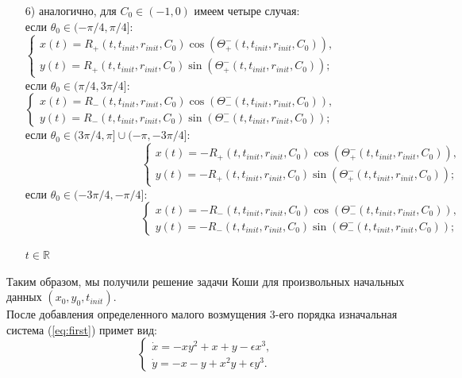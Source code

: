\begin{enumerate}
\item[{6)}] аналогично, для $C_0\in(-1,0)$ имеем четыре случая:\\
если $\theta_0 \in (-\pi/4, \pi/4]$:
$ \begin{cases}
       x(t) = R_+(t,t_{init}, r_{init}, C_0)\cos(\Theta^-_+(t,t_{init},r_{init},C_0)),\\
       y(t) = R_+(t,t_{init}, r_{init}, C_0)\sin(\Theta^-_+(t,t_{init},r_{init},C_0));
\end{cases}$ \\
если $\theta_0 \in (\pi/4, 3\pi/4]$:
$ \begin{cases}
       x(t) = R_-(t,t_{init}, r_{init}, C_0)\cos(\Theta^-_-(t,t_{init},r_{init},C_0)),\\
       y(t) = R_-(t,t_{init}, r_{init}, C_0)\sin(\Theta^-_-(t,t_{init},r_{init},C_0));
\end{cases}$ \\
если $ \theta_0 \in (3\pi/4, \pi]\cup(-\pi, -3\pi/4]$:\\
$\hspace{125pt} \begin{cases}
       x(t) = -R_+(t,t_{init}, r_{init}, C_0)\cos(\Theta^-_+(t,t_{init},r_{init},C_0)),\\
       y(t) = -R_+(t,t_{init}, r_{init}, C_0)\sin(\Theta^-_+(t,t_{init},r_{init},C_0));
\end{cases}$ \\
если $\theta_0 \in (-3\pi/4, -\pi/4]$:\\
$\hspace{125pt} \begin{cases}
       x(t) = -R_-(t,t_{init}, r_{init}, C_0)\cos(\Theta^-_-(t,t_{init},r_{init},C_0)),\\
       y(t) = -R_-(t,t_{init}, r_{init}, C_0)\sin(\Theta^-_-(t,t_{init},r_{init},C_0));
\end{cases}$ \\
\begin{center}
    $t\in \mathbb{R}$
\end{center}
\end{enumerate}

Таким образом, мы получили решение задачи Коши для произвольных начальных данных $(x_0, y_0, t_{init})$.\\

После добавления определенного малого возмущения 3-его порядка изначальная система (\ref{eq:first}) примет вид:
\begin{equation}
\begin{cases}
      \dot x=-xy^2+x+y-\epsilon x^3,\\
      \dot y=-x-y+x^2y+\epsilon y^3.
    \end{cases}
    \label{eq:second}
\end{equation}

